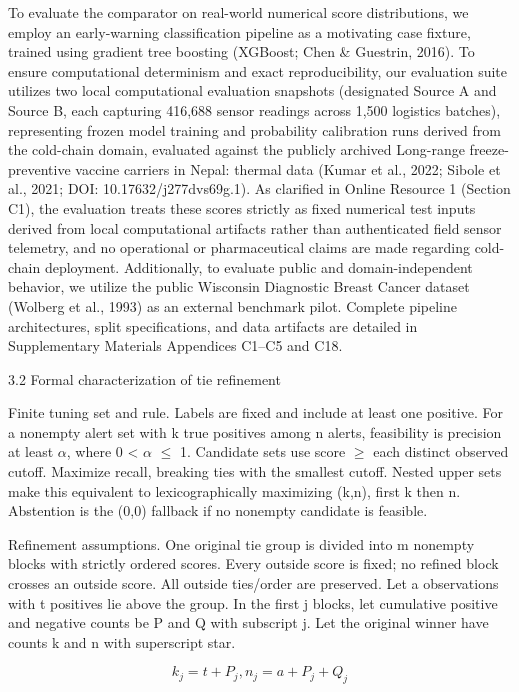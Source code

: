 \documentclass[11pt,a4paper]{article}
\begin{document}
To evaluate the comparator on real-world numerical score distributions, we employ an early-warning classification pipeline as a motivating case fixture, trained using gradient tree boosting (XGBoost; Chen \& Guestrin, 2016). To ensure computational determinism and exact reproducibility, our evaluation suite utilizes two local computational evaluation snapshots (designated Source A and Source B, each capturing 416,688 sensor readings across 1,500 logistics batches), representing frozen model training and probability calibration runs derived from the cold-chain domain, evaluated against the publicly archived Long-range freeze-preventive vaccine carriers in Nepal: thermal data (Kumar et al., 2022; Sibole et al., 2021; DOI: 10.17632/j277dvs69g.1). As clarified in Online Resource 1 (Section C1), the evaluation treats these scores strictly as fixed numerical test inputs derived from local computational artifacts rather than authenticated field sensor telemetry, and no operational or pharmaceutical claims are made regarding cold-chain deployment. Additionally, to evaluate public and domain-independent behavior, we utilize the public Wisconsin Diagnostic Breast Cancer dataset (Wolberg et al., 1993) as an external benchmark pilot. Complete pipeline architectures, split specifications, and data artifacts are detailed in Supplementary Materials Appendices C1--C5 and C18.

3.2 Formal characterization of tie refinement

Finite tuning set and rule. Labels are fixed and include at least one positive. For a nonempty alert set with k true positives among n alerts, feasibility is precision at least \ensuremath{\alpha}, where 0 < \ensuremath{\alpha} \ensuremath{\leq} 1. Candidate sets use score \ensuremath{\geq} each distinct observed cutoff. Maximize recall, breaking ties with the smallest cutoff. Nested upper sets make this equivalent to lexicographically maximizing (k,n), first k then n. Abstention is the (0,0) fallback if no nonempty candidate is feasible.

Refinement assumptions. One original tie group is divided into m nonempty blocks with strictly ordered scores. Every outside score is fixed; no refined block crosses an outside score. All outside ties/order are preserved. Let a observations with t positives lie above the group. In the first j blocks, let cumulative positive and negative counts be P and Q with subscript j. Let the original winner have counts k and n with superscript star.

\[{k}_{j} = t + {P}_{j},    {n}_{j} = a + {P}_{j} + {Q}_{j}\]
\end{document}
